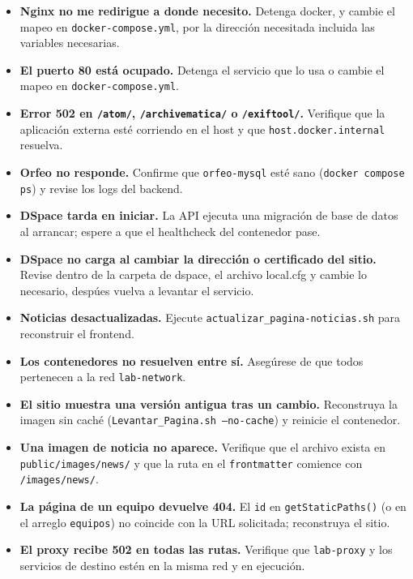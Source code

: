 \documentclass[12pt,a4paper]{report}
\begin{document}
\begin{itemize}
   \item \textbf{Nginx no me redirigue a donde necesito.} Detenga docker, y cambie el mapeo en \texttt{docker-compose.yml}, por la dirección necesitada incluida las variables necesarias.
  \item \textbf{El puerto 80 está ocupado.} Detenga el servicio que lo usa o
        cambie el mapeo en \texttt{docker-compose.yml}.
  \item \textbf{Error 502 en \texttt{/atom/}, \texttt{/archivematica/} o
        \texttt{/exiftool/}.} Verifique que la aplicación externa esté
        corriendo en el host y que \texttt{host.docker.internal} resuelva.
  \item \textbf{Orfeo no responde.} Confirme que \texttt{orfeo-mysql} esté
        sano (\texttt{docker compose ps}) y revise los logs del backend.
  \item \textbf{DSpace tarda en iniciar.} La API ejecuta una migración de base
        de datos al arrancar; espere a que el healthcheck del contenedor pase.
   \item \textbf{DSpace no carga al cambiar la dirección o certificado del sitio.} Revise dentro de la carpeta de dspace, el archivo local.cfg y cambie lo necesario, despúes vuelva a levantar el servicio.
  \item \textbf{Noticias desactualizadas.} Ejecute
        \texttt{actualizar\_pagina-noticias.sh} para reconstruir el frontend.
  \item \textbf{Los contenedores no resuelven entre sí.} Asegúrese de que todos
        pertenecen a la red \texttt{lab-network}.
  \item \textbf{El sitio muestra una versión antigua tras un cambio.}
        Reconstruya la imagen sin caché
        (\texttt{Levantar\_Pagina.sh --no-cache}) y reinicie el contenedor.
  \item \textbf{Una imagen de noticia no aparece.} Verifique que el archivo
        exista en \texttt{public/images/news/} y que la ruta en el
        \texttt{frontmatter} comience con \texttt{/images/news/}.
  \item \textbf{La página de un equipo devuelve 404.} El \texttt{id} en
        \texttt{getStaticPaths()} (o en el arreglo \texttt{equipos}) no
        coincide con la URL solicitada; reconstruya el sitio.
  \item \textbf{El proxy recibe 502 en todas las rutas.} Verifique que
        \texttt{lab-proxy} y los servicios de destino estén en la misma red y
        en ejecución.
\end{itemize}
\end{document}
